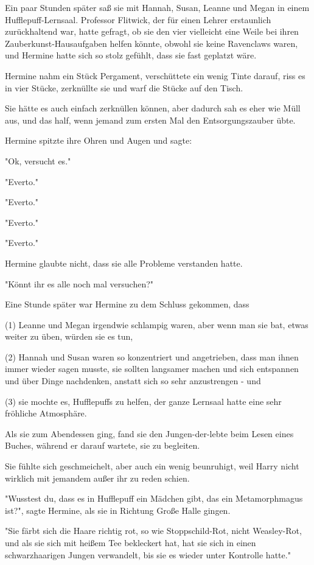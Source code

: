 {Ein paar Stunden später saß sie mit Hannah, Susan, Leanne und Megan in einem Hufflepuff-Lernsaal. Professor Flitwick, der für einen Lehrer erstaunlich zurückhaltend war, hatte gefragt, ob sie den vier vielleicht eine Weile bei ihren Zauberkunst-Hausaufgaben helfen könnte, obwohl sie keine Ravenclaws waren, und Hermine hatte sich so stolz gefühlt, dass sie fast geplatzt wäre.

Hermine nahm ein Stück Pergament, verschüttete ein wenig Tinte darauf, riss es in vier Stücke, zerknüllte sie und warf die Stücke auf den Tisch.

Sie hätte es auch einfach zerknüllen können, aber dadurch sah es eher wie Müll aus, und das half, wenn jemand zum ersten Mal den Entsorgungszauber übte.

Hermine spitzte ihre Ohren und Augen und sagte:

"Ok, versucht es."

"Everto."

"Everto."

"Everto."

"Everto."

Hermine glaubte nicht, dass sie alle Probleme verstanden hatte.

"Könnt ihr es alle noch mal versuchen?"

Eine Stunde später war Hermine zu dem Schluss gekommen, dass

(1) Leanne und Megan irgendwie schlampig waren, aber wenn man sie bat, etwas weiter zu üben, würden sie es tun,

(2) Hannah und Susan waren so konzentriert und angetrieben, dass man ihnen immer wieder sagen musste, sie sollten langsamer machen und sich entspannen und über Dinge nachdenken, anstatt sich so sehr anzustrengen - und

(3) sie mochte es, Hufflepuffs zu helfen, der ganze Lernsaal hatte eine sehr fröhliche Atmosphäre.

Als sie zum Abendessen ging, fand sie den Jungen-der-lebte beim Lesen eines Buches, während er darauf wartete, sie zu begleiten.

Sie fühlte sich geschmeichelt, aber auch ein wenig beunruhigt, weil Harry nicht wirklich mit jemandem außer ihr zu reden schien.

"Wusstest du, dass es in Hufflepuff ein Mädchen gibt, das ein Metamorphmagus ist?", sagte Hermine, als sie in Richtung Große Halle gingen.

"Sie färbt sich die Haare richtig rot, so wie Stoppschild-Rot, nicht Weasley-Rot, und als sie sich mit heißem Tee bekleckert hat, hat sie sich in einen schwarzhaarigen Jungen verwandelt, bis sie es wieder unter Kontrolle hatte."

}
